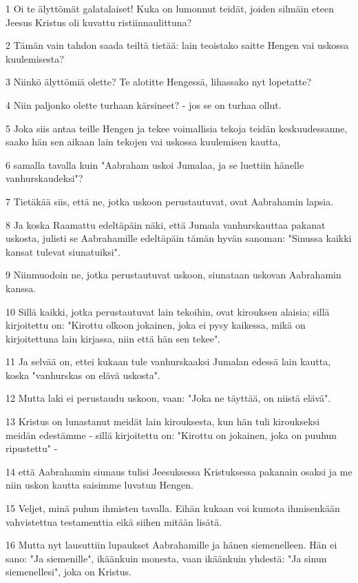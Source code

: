 \par 1 Oi te älyttömät galatalaiset! Kuka on lumonnut teidät, joiden silmäin eteen Jeesus Kristus oli kuvattu ristiinnaulittuna?
\par 2 Tämän vain tahdon saada teiltä tietää: lain teoistako saitte Hengen vai uskossa kuulemisesta?
\par 3 Niinkö älyttömiä olette? Te alotitte Hengessä, lihassako nyt lopetatte?
\par 4 Niin paljonko olette turhaan kärsineet? - jos se on turhaa ollut.
\par 5 Joka siis antaa teille Hengen ja tekee voimallisia tekoja teidän keskuudessanne, saako hän sen aikaan lain tekojen vai uskossa kuulemisen kautta,
\par 6 samalla tavalla kuin "Aabraham uskoi Jumalaa, ja se luettiin hänelle vanhurskaudeksi"?
\par 7 Tietäkää siis, että ne, jotka uskoon perustautuvat, ovat Aabrahamin lapsia.
\par 8 Ja koska Raamattu edeltäpäin näki, että Jumala vanhurskauttaa pakanat uskosta, julisti se Aabrahamille edeltäpäin tämän hyvän sanoman: "Sinussa kaikki kansat tulevat siunatuiksi".
\par 9 Niinmuodoin ne, jotka perustautuvat uskoon, siunataan uskovan Aabrahamin kanssa.
\par 10 Sillä kaikki, jotka perustautuvat lain tekoihin, ovat kirouksen alaisia; sillä kirjoitettu on: "Kirottu olkoon jokainen, joka ei pysy kaikessa, mikä on kirjoitettuna lain kirjassa, niin että hän sen tekee".
\par 11 Ja selvää on, ettei kukaan tule vanhurskaaksi Jumalan edessä lain kautta, koska "vanhurskas on elävä uskosta".
\par 12 Mutta laki ei perustaudu uskoon, vaan: "Joka ne täyttää, on niistä elävä".
\par 13 Kristus on lunastanut meidät lain kirouksesta, kun hän tuli kiroukseksi meidän edestämme - sillä kirjoitettu on: "Kirottu on jokainen, joka on puuhun ripustettu" -
\par 14 että Aabrahamin siunaus tulisi Jeesuksessa Kristuksessa pakanain osaksi ja me niin uskon kautta saisimme luvatun Hengen.
\par 15 Veljet, minä puhun ihmisten tavalla. Eihän kukaan voi kumota ihmisenkään vahvistettua testamenttia eikä siihen mitään lisätä.
\par 16 Mutta nyt lausuttiin lupaukset Aabrahamille ja hänen siemenelleen. Hän ei sano: "Ja siemenille", ikäänkuin monesta, vaan ikäänkuin yhdestä: "Ja sinun siemenellesi", joka on Kristus.

